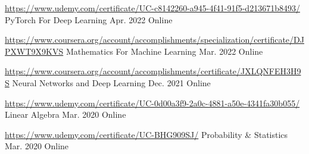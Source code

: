 

\begin{cventries}

  \cventry 
    {\url{https://www.udemy.com/certificate/UC-c8142260-a945-4f41-91f5-d213671b8493/}} %
    {PyTorch For Deep Learning} %
    {Apr. 2022} %
    {Online} %
    {}

  \cventry 
    {\url{https://www.coursera.org/account/accomplishments/specialization/certificate/DJPXWT9X9KVS}} %
    {Mathematics For Machine Learning} %
    {Mar. 2022} %
    {Online} %
    {}

  \cventry 
    {\url{https://www.coursera.org/account/accomplishments/certificate/JXLQNFEH3H9S}} %
    {Neural Networks and Deep Learning} %
    {Dec. 2021} %
    {Online} %
    {}

  \cventry 
    {\url{https://www.udemy.com/certificate/UC-0d00a3f9-2a0c-4881-a50e-4341fa30b055/}} %
    {Linear Algebra} %
    {Mar. 2020} %
    {Online} %
    {}

  \cventry 
    {\url{https://www.udemy.com/certificate/UC-BHG909SJ/}} %
    {Probability \& Statistics} %
    {Mar. 2020} %
    {Online} %
    {}
\end{cventries}

